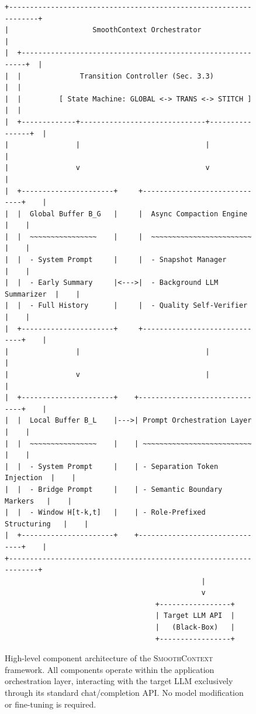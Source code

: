 \documentclass[10pt,twocolumn]{article}
\newcommand{\sys}{\textsc{SmoothContext}}
\begin{document}
\begin{figure}[t]
\centering
\small
\begin{verbatim}
+------------------------------------------------------------------+
|                    SmoothContext Orchestrator                     |
|  +------------------------------------------------------------+  |
|  |              Transition Controller (Sec. 3.3)               |  |
|  |         [ State Machine: GLOBAL <-> TRANS <-> STITCH ]      |  |
|  +-------------+------------------------------+----------------+  |
|                |                              |                   |
|                v                              v                   |
|  +----------------------+     +------------------------------+    |
|  |  Global Buffer B_G   |     |  Async Compaction Engine      |    |
|  |  ~~~~~~~~~~~~~~~~    |     |  ~~~~~~~~~~~~~~~~~~~~~~~~     |    |
|  |  - System Prompt     |     |  - Snapshot Manager           |    |
|  |  - Early Summary     |<--->|  - Background LLM Summarizer  |    |
|  |  - Full History      |     |  - Quality Self-Verifier      |    |
|  +----------------------+     +------------------------------+    |
|                |                              |                   |
|                v                              |                   |
|  +----------------------+    +-------------------------------+    |
|  |  Local Buffer B_L    |--->| Prompt Orchestration Layer    |    |
|  |  ~~~~~~~~~~~~~~~~    |    | ~~~~~~~~~~~~~~~~~~~~~~~~~~    |    |
|  |  - System Prompt     |    | - Separation Token Injection  |    |
|  |  - Bridge Prompt     |    | - Semantic Boundary Markers   |    |
|  |  - Window H[t-k,t]   |    | - Role-Prefixed Structuring   |    |
|  +----------------------+    +-------------------------------+    |
+------------------------------------------------------------------+
                                               |
                                               v
                                    +-----------------+
                                    | Target LLM API  |
                                    |   (Black-Box)   |
                                    +-----------------+
\end{verbatim}
\caption{High-level component architecture of the \sys{} framework. All components operate within the application orchestration layer, interacting with the target LLM exclusively through its standard chat/completion API. No model modification or fine-tuning is required.}
\label{fig:architecture}
\end{figure}
\end{document}
